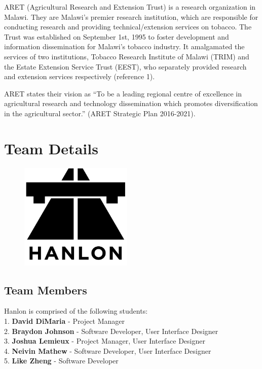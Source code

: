 \documentclass[12pt,letterpaper]{article}
\begin{document}
ARET (Agricultural Research and Extension Trust) is a research organization in Malawi. They are Malawi’s premier research institution, which are  responsible for conducting research and providing technical/extension services on tobacco. The Trust was established on September 1st, 1995 to foster development and information dissemination for Malawi’s tobacco industry. It amalgamated the services of two institutions, Tobacco Research Institute of Malawi (TRIM) and the Estate Extension Service Trust (EEST), who separately provided research and extension services respectively (reference 1). \par

ARET states their vision as “To be a leading regional centre of excellence in agricultural research and technology dissemination which promotes diversification in the agricultural sector.” (ARET Strategic Plan 2016-2021). 

\section{Team Details}
\begin{figure}[H]
	\centering	
	\includegraphics[height=2in]{img/hanlon-logo.png}
	\label{fig:kitten}
\end{figure}

\subsection{Team Members}
Hanlon is comprised of the following students:\\
1. \textbf{\hspace*{5pt} David DiMaria} - Project Manager\\
2. \textbf{\hspace*{5pt}Braydon Johnson} - Software Developer, User Interface Designer\\
3. \textbf{\hspace*{5pt}Joshua Lemieux} - Project Manager, User Interface Designer\\
4. \textbf{\hspace*{5pt}Neivin Mathew} - Software Developer, User Interface Designer\\
5. \textbf{\hspace*{5pt}Like Zheng} - Software Developer
\end{document}
